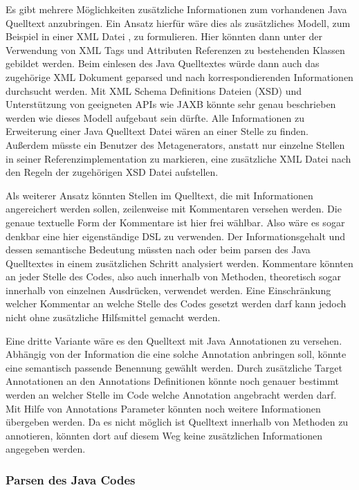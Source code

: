 \documentclass[12pt,oneside,a4paper,parskip]{scrbook}
\begin{document}
Es gibt mehrere Möglichkeiten zusätzliche Informationen zum vorhandenen Java Quelltext anzubringen. Ein Ansatz hierfür wäre dies als zusätzliches Modell, zum Beispiel in einer XML Datei \cite{xml2008}, zu formulieren. Hier könnten dann unter der Verwendung von XML Tags und Attributen Referenzen zu bestehenden Klassen gebildet werden. Beim einlesen des Java Quelltextes würde dann auch das zugehörige XML Dokument geparsed und nach korrespondierenden Informationen durchsucht werden. Mit XML Schema Definitions Dateien (XSD) \cite{xsd2012} und Unterstützung von geeigneten APIs wie JAXB \cite{jaxb} könnte sehr genau beschrieben werden wie dieses Modell aufgebaut sein dürfte. Alle Informationen zu Erweiterung einer Java Quelltext Datei wären an einer Stelle zu finden. Außerdem müsste ein Benutzer des Metagenerators, anstatt nur einzelne Stellen in seiner Referenzimplementation zu markieren, eine zusätzliche XML Datei nach den Regeln der zugehörigen XSD Datei aufstellen.

Als weiterer Ansatz könnten Stellen im Quelltext, die mit Informationen angereichert werden sollen, zeilenweise mit Kommentaren versehen werden. Die genaue textuelle Form der Kommentare ist hier frei wählbar. Also wäre es sogar denkbar eine hier eigenständige DSL zu verwenden. Der Informationsgehalt und dessen semantische Bedeutung müssten nach oder beim parsen des Java Quelltextes in einem zusätzlichen Schritt analysiert werden. Kommentare könnten an jeder Stelle des Codes, also auch innerhalb von Methoden, theoretisch sogar innerhalb von einzelnen Ausdrücken, verwendet werden. Eine Einschränkung welcher Kommentar an welche Stelle des Codes gesetzt werden darf kann jedoch nicht ohne zusätzliche Hilfsmittel gemacht werden.

Eine dritte Variante wäre es den Quelltext mit Java Annotationen zu versehen. Abhängig von der Information die eine solche Annotation anbringen soll, könnte eine semantisch passende Benennung gewählt werden. Durch zusätzliche Target Annotationen an den Annotations Definitionen könnte noch genauer bestimmt werden an welcher Stelle im Code welche Annotation angebracht werden darf. Mit Hilfe von Annotations Parameter könnten noch weitere Informationen übergeben werden. Da es nicht möglich ist Quelltext innerhalb von Methoden zu annotieren, könnten dort auf diesem Weg keine zusätzlichen Informationen angegeben werden.

\subsubsection{Parsen des Java Codes}
\end{document}
